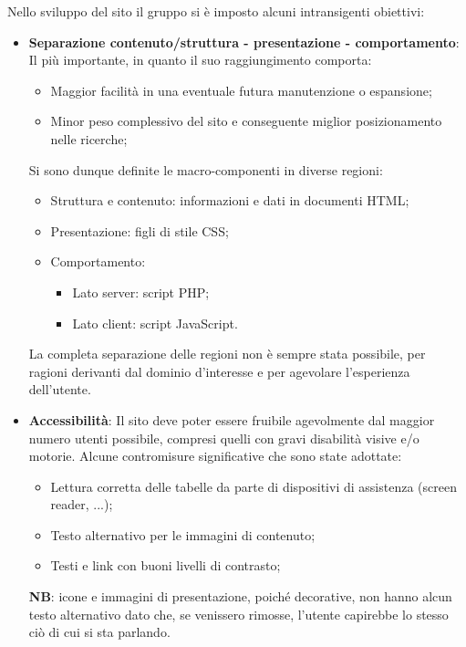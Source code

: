 Nello sviluppo del sito il gruppo si è imposto alcuni intransigenti obiettivi:
\begin{itemize}
    \item \textbf{Separazione contenuto/struttura - presentazione - comportamento}: Il più importante, in quanto il suo raggiungimento comporta:
	\begin{itemize}
	\item Maggior facilità in una eventuale futura manutenzione o espansione;
	\item Minor peso complessivo del sito e conseguente miglior posizionamento nelle ricerche;
	\end{itemize}	    

    Si sono dunque definite le macro-componenti in diverse regioni:
    \begin{itemize}
    	\item Struttura e contenuto: informazioni e dati in documenti HTML;
    	\item Presentazione: figli di stile CSS;
    	\item Comportamento:
    		\begin{itemize}
    		\item Lato server: script PHP;
    		\item Lato client: script JavaScript.
    		\end{itemize}
	\end{itemize}    
	
	La completa separazione delle regioni non è sempre stata possibile, per ragioni derivanti dal dominio d'interesse e per agevolare l'esperienza dell'utente.	
	
   \item \textbf{Accessibilità}: Il sito deve poter essere fruibile agevolmente dal maggior numero utenti possibile, compresi quelli con gravi disabilità visive e/o
    motorie. Alcune contromisure significative che sono state adottate:
    \begin{itemize}
        \item Lettura corretta delle tabelle da parte di dispositivi di assistenza (screen reader, ...);
        \item Testo alternativo per le immagini di contenuto;
        \item Testi e link con buoni livelli di contrasto;
    \end{itemize}
    
    \textbf{NB}: icone e immagini di presentazione, poiché decorative, non hanno alcun testo alternativo dato che, se venissero rimosse, l'utente capirebbe lo stesso ciò di cui si sta parlando.
    

\end{itemize}
